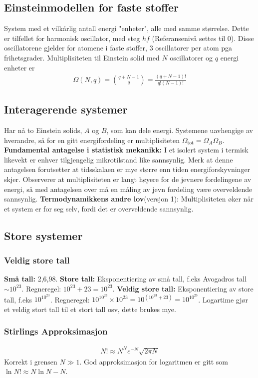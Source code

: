 \documentclass[12pt]{article}
\begin{document}
\subsection{Einsteinmodellen for faste stoffer}
System med et vilkårlig antall energi "enheter", alle med samme størrelse. Dette
er tilfellet for harmonisk oscillator, med steg $hf$ (Referansenivå settes til 0).
Disse oscillatorene gjelder for atomene i faste stoffer, 3 oscillatorer per atom
pga frihetsgrader. Multiplisiteten til Einstein solid med $N$ oscillatorer og
$q$ energi enheter er
\begin{align*}
  \Omega(N,q) = \binom{q + N - 1}{q} = \frac{(q + N - 1)!}{q!(N-1)!}
\end{align*}
\subsection{Interagerende systemer}
Har nå to Einstein solids, $A$ og $B$, som kan dele energi. Systemene uavhengige
av hverandre, så for en gitt energifordeling er multiplisiteten $\Omega_\text{tot} = \Omega_A \Omega_B$.\newline \noindent
\textbf{Fundamental antagelse i statistisk mekanikk:} I et isolert system i termisk
likevekt er enhver tilgjengelig mikrotilstand like sannsynlig. Merk at denne antagelsen
forutsetter at tidsskalaen er mye større enn tiden energiforskyvninger skjer. \newline \noindent
Observerer at multiplisiteten er langt høyere for de jevnere fordelingene av energi,
så med antagelsen over må en måling av jevn fordeling være overveldende sannsynlig.
\textbf{Termodynamikkens andre lov}(versjon 1): Multiplisiteten øker når et system
er for seg selv, fordi det er overveldende sannsynlig.
\subsection{Store systemer}
\subsubsection{Veldig store tall}
\textbf{Små tall:} 2,6,98. \textbf{Store tall:} Eksponentiering av små tall, f.eks
Avogadros tall $\sim 10^{23}$. Regneregel: $10^{23} + 23 = 10^{23}$.
\textbf{Veldig store tall:} Eksponentiering av store tall, f.eks $10^{10^{23}}$.
Regneregel: $10^{10^{23}} \times 10^{23} = 10^{(10^{23} + 23)} = 10^{10^{23}}$.
Logartime gjør et veldig stort tall til et stort tall osv, dette brukes mye.
\subsubsection{Stirlings Approksimasjon}
\begin{align*}
  N! \approx N^N e^{-N}\sqrt{2\pi N}
\end{align*}
Korrekt i grensen $N \gg 1$. God approksimasjon for logaritmen er gitt som $\ln{N!} \approx N \ln N - N$.
\end{document}
